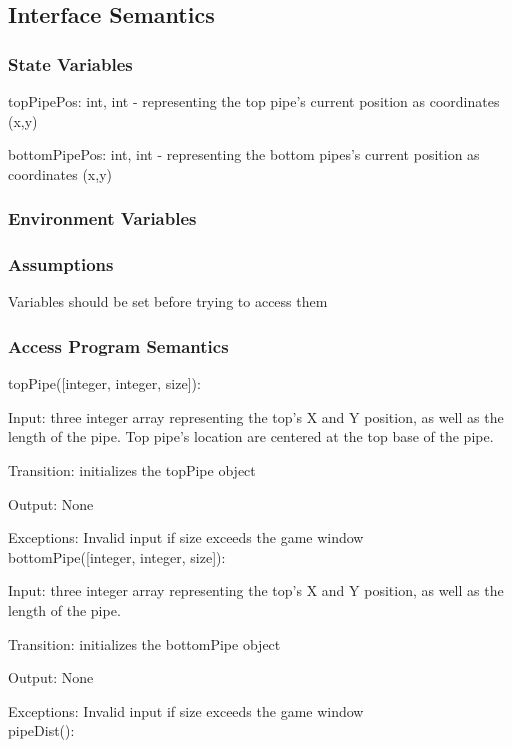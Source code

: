 \documentclass[12pt, titlepage]{article}
\begin{document}
		\subsection{Interface Semantics}
		\subsubsection{State Variables}
		topPipePos: int, int - representing the top pipe's current position as coordinates (x,y)
		
		bottomPipePos: int, int - representing the bottom pipes's current position as coordinates (x,y)
		\subsubsection{Environment Variables}
		
		
		\subsubsection{Assumptions}
		Variables should be set before trying to access them \\ 
		
		
		\subsubsection{Access Program Semantics}
		
		
		topPipe([integer, integer, size]):
		
		Input: three integer array representing the top's X and Y position, as well as the length of the pipe. Top pipe's location are centered at the top base of the pipe.

		
		Transition: initializes the topPipe object
		
		Output: None
		
		Exceptions: Invalid input if size exceeds the game window\\
		
		bottomPipe([integer, integer, size]):
		
		Input: three integer array representing the top's X and Y position, as well as the length of the pipe. 

		
		Transition: initializes the bottomPipe object
		
		Output: None
		
		Exceptions: Invalid input if size exceeds the game window\\
		
		pipeDist():
		
\end{document}
